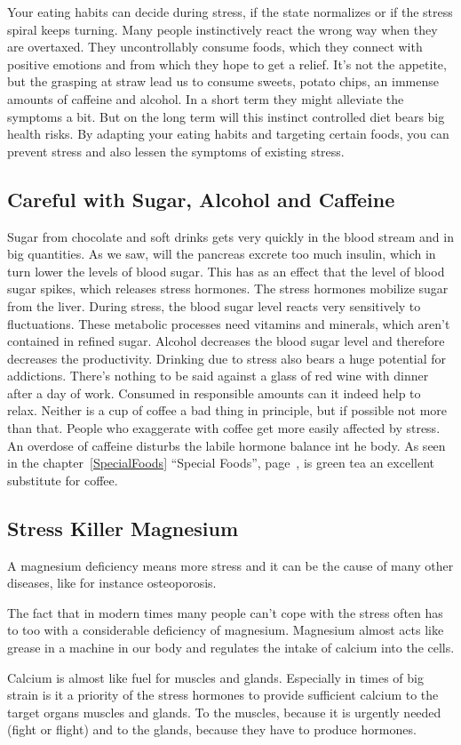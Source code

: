 \documentclass[../main.tex]{subfiles}
\begin{document}
Your eating habits can decide during stress, if the state normalizes or if the stress spiral keeps turning.
Many people instinctively react the wrong way when they are overtaxed.
They uncontrollably consume foods, which they connect with positive emotions and from which they hope to get a relief.
It's not the appetite, but the grasping at straw lead us to consume sweets, potato chips, an immense amounts of caffeine and alcohol.
In a short term they might alleviate the symptoms a bit.
But on the long term will this instinct controlled diet bears big health risks.
By adapting your eating habits and targeting certain foods, you can prevent stress and also lessen the symptoms of existing stress.

\subsection{Careful with Sugar, Alcohol and Caffeine}

Sugar from chocolate and soft drinks gets very quickly in the blood stream and in big quantities.
As we saw, will the pancreas excrete too much insulin, which in turn lower the levels of blood sugar.
This has as an effect that the level of blood sugar spikes, which releases stress hormones.
The stress hormones mobilize sugar from the liver.
During stress, the blood sugar level reacts very sensitively to fluctuations.
These metabolic processes need vitamins and minerals, which aren't contained in refined sugar.
Alcohol decreases the blood sugar level and therefore decreases the productivity.
Drinking due to stress also bears a huge potential for addictions.
There's nothing to be said against a glass of red wine with dinner after a day of work.
Consumed in responsible amounts can it indeed help to relax.
Neither is a cup of coffee a bad thing in principle, but if possible not more than that.
People who exaggerate with coffee get more easily affected by stress.
An overdose of caffeine disturbs the labile hormone balance int he body.
As seen in the chapter~\ref{SpecialFoods} ``Special Foods'', page~\pageref{SpecialFoods}, is green tea
an excellent substitute for coffee.

\subsection{Stress Killer Magnesium}
 
A magnesium deficiency means more stress and it can be the cause of many other diseases,
like for instance osteoporosis.

The fact that in modern times many people can't cope with the stress often has to too with a
considerable deficiency of magnesium.
Magnesium almost acts like grease in a machine in our body and regulates the intake of calcium into the cells.

Calcium is almost like fuel for muscles and glands.
Especially in times of big strain is it a priority of the stress hormones to provide sufficient calcium to the target organs muscles and glands.
To the muscles, because it is urgently needed (fight or flight) and to the glands,
because they have to produce hormones.
\end{document}
